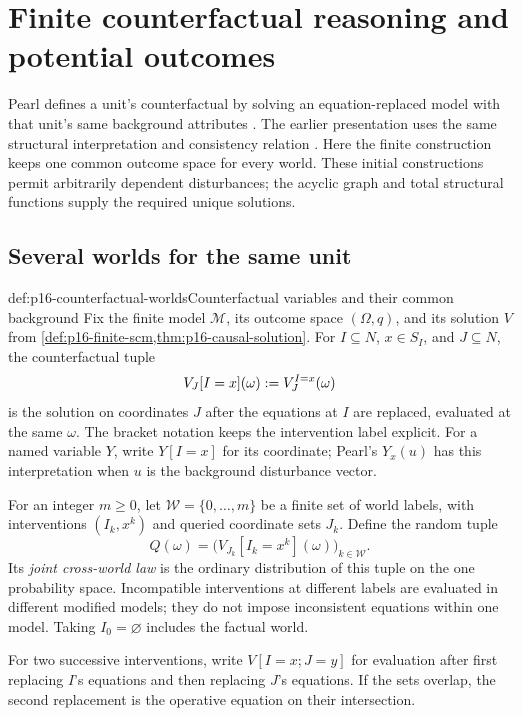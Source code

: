 \section{Finite counterfactual reasoning and potential outcomes}
\label{sec:p16-finite-counterfactuals}

Pearl defines a unit's counterfactual by solving an equation-replaced
model with that unit's same background attributes
\cite[Definition~4 and Eq.~(27), pp.~120--121]{Pearl2009CausalOverview}.
The earlier presentation uses the same structural interpretation and
consistency relation \cite[author's rejoinder, p.~703]{Pearl1995CausalDiagrams}.
Here the finite construction keeps one common outcome space for every
world. These initial constructions permit arbitrarily dependent
disturbances; the acyclic graph and total structural functions supply
the required unique solutions.

\subsection{Several worlds for the same unit}

\begin{hbdefinition}{def:p16-counterfactual-worlds}{Counterfactual variables and their common background}
Fix the finite model \(\mathcal M\), its outcome space
\((\Omega,q)\), and its solution \(V\) from
\cref{def:p16-finite-scm,thm:p16-causal-solution}.
For \(I\subseteq N\), \(x\in S_I\), and \(J\subseteq N\),
the counterfactual tuple
\[
 V_J[I=x](\omega)\mathrel{:=} V_J^{I=x}(\omega)
\]
is the solution on coordinates \(J\) after the equations at \(I\)
are replaced, evaluated at the same \(\omega\). The bracket notation
keeps the intervention label explicit. For a named variable \(Y\),
write \(Y[I=x]\) for its coordinate; Pearl's \(Y_x(u)\) has
this interpretation when \(u\) is the background disturbance vector.

For an integer \(m\geq0\), let \(\mathcal W=\{0,\ldots,m\}\) be a finite set of world
labels, with interventions \((I_k,x^k)\) and queried coordinate
sets \(J_k\). Define the random tuple
\[
 Q(\omega)=\bigl(V_{J_k}[I_k=x^k](\omega)\bigr)_{k\in\mathcal W}.
\]
Its \emph{joint cross-world law} is the ordinary distribution of
this tuple on the one probability space. Incompatible interventions
at different labels are evaluated in different modified models;
they do not impose inconsistent equations within one model.
Taking \(I_0=\varnothing\) includes the factual world.

For two successive interventions, write
\(V[I=x;J=y]\) for evaluation after first replacing \(I\)'s
equations and then replacing \(J\)'s equations. If the sets overlap,
the second replacement is the operative equation on their intersection.
\end{hbdefinition}

